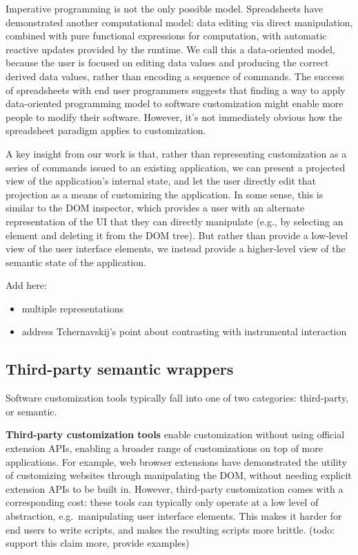 \documentclass[sigplan,10pt,anonymous,review]{acmart}
\providecommand{\tightlist}{%
  \setlength{\itemsep}{0pt}\setlength{\parskip}{0pt}}
\begin{document}
Imperative programming is not the only possible model. Spreadsheets have
demonstrated another computational model: data editing via direct
manipulation, combined with pure functional expressions for computation,
with automatic reactive updates provided by the runtime. We call this a
data-oriented model, because the user is focused on editing data values
and producing the correct derived data values, rather than encoding a
sequence of commands. The success of spreadsheets with end user
programmers suggests that finding a way to apply data-oriented
programming model to software customization might enable more people to
modify their software. However, it's not immediately obvious how the
spreadsheet paradigm applies to customization.

A key insight from our work is that, rather than representing
customization as a series of commands issued to an existing application,
we can present a projected view of the application's internal state, and
let the user directly edit that projection as a means of customizing the
application. In some sense, this is similar to the DOM inspector, which
provides a user with an alternate representation of the UI that they can
directly manipulate (e.g., by selecting an element and deleting it from
the DOM tree). But rather than provide a low-level view of the user
interface elements, we instead provide a higher-level view of the
semantic state of the application.

Add here:

\begin{itemize}
\tightlist
\item
  multiple representations \citep{ainsworth1999}
\item
  address Tchernavskij's point about contrasting with instrumental
  interaction
\end{itemize}

\hypertarget{third-party-semantic-wrappers}{%
\subsection{Third-party semantic
wrappers}\label{third-party-semantic-wrappers}}

Software customization tools typically fall into one of two categories:
third-party, or semantic.

\textbf{Third-party customization tools} enable customization without
using official extension APIs, enabling a broader range of
customizations on top of more applications. For example, web browser
extensions have demonstrated the utility of customizing websites through
manipulating the DOM, without needing explicit extension APIs to be
built in. However, third-party customization comes with a corresponding
cost: these tools can typically only operate at a low level of
abstraction, e.g.~manipulating user interface elements. This makes it
harder for end users to write scripts, and makes the resulting scripts
more brittle. (todo: support this claim more, provide examples)
\end{document}
